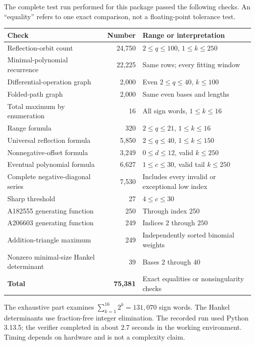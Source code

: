 \documentclass[11pt,letterpaper]{article}
\numberwithin{equation}{section}
\theoremstyle{definition}
\begin{document}
The complete test run performed for this package passed the following
checks.  An ``equality'' refers to one exact comparison, not a
floating-point tolerance test.

\begin{center}
\small
\begin{tabular}{p{}r p{}}
\toprule
Check & Number & Range or interpretation \\
\midrule
Reflection-orbit count & 24,750 & $2\le q\le100$, $1\le k\le250$ \\
Minimal-polynomial recurrence & 22,225 & Same rows; every fitting window \\
Differential-operation graph & 2,000 & Even $2\le q\le40$, $k\le100$ \\
Folded-path graph & 2,000 & Same even bases and lengths \\
Total maximum by enumeration & 16 & All sign words, $1\le k\le16$ \\
Range formula & 320 & $2\le q\le21$, $1\le k\le16$ \\
Universal reflection formula & 5,850 & $2\le q\le40$, $1\le k\le150$ \\
Nonnegative-offset formula & 3,249 & $0\le d\le12$, valid $k\le250$ \\
Eventual polynomial formula & 6,627 & $1\le c\le30$, valid tail $k\le250$ \\
Complete negative-diagonal series & 7,530 & Includes every invalid or exceptional low index \\
Sharp threshold & 27 & $4\le c\le30$ \\
A182555 generating function & 250 & Through index 250 \\
A206603 generating function & 249 & Indices $2$ through $250$ \\
Addition-triangle maximum & 249 & Independently sorted binomial weights \\
Nonzero minimal-size Hankel determinant & 39 & Bases $2$ through $40$ \\
\midrule
\textbf{Total} & \textbf{75,381} & Exact equalities or nonsingularity checks \\
\bottomrule
\end{tabular}
\end{center}

The exhaustive part examines $\sum_{k=1}^{16}2^k=131{,}070$ sign words.
The Hankel determinants use fraction-free integer elimination.
The recorded run used Python 3.13.5; the verifier completed in about
2.7 seconds in the working environment.  Timing depends on hardware
and is not a complexity claim.
\end{document}
